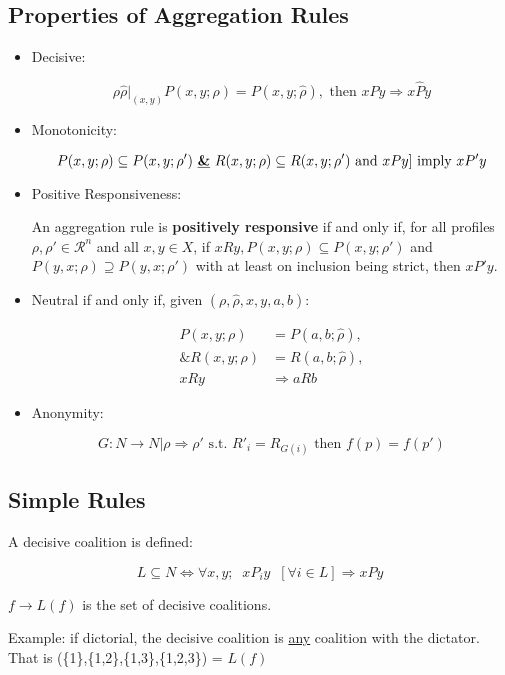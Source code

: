 \documentclass{article}
\newcommand{\R}{\mathcal{R}}
\begin{document}
 \subsection*{Properties of Aggregation Rules}
 \begin{itemize}
 
 \item Decisive:

 \[
\rho\hat{\rho}|_{(x,y)} P(x,y; \rho) = P(x,y; \hat{\rho}), \text{ then } xPy \Rightarrow x\hat{P}y
 \]


 \item Monotonicity:

 \[
P(x,y;\rho)\subseteq P(x,y; \rho') \text{ \textbf{\underline{\&}} } R(x,y;\rho)\subseteq R(x,y; \rho') \text{ and } xPy ]  \text{ imply } xP'y
 \]


 \item Positive Responsiveness:

An aggregation rule is \textbf{positively responsive} if and only if, for all profiles $\rho,\rho' \in \R^n$ and all $x,y \in X$, if $xRy, P(x,y;\rho) \subseteq P(x,y;\rho')$ and $P(y,x; \rho)\supseteq P(y,x; \rho')$ with at least on inclusion being strict, then $xP'y$. 
\item Neutral if and only if, given $(\rho, \hat{\rho}, x,y,a,b) $:

\begin{align*}
P(x,y;\rho) &= P(a,b; \hat{\rho}),\\
\&R(x,y;\rho) &= R(a,b; \hat{\rho}),\\
xRy &\Rightarrow aRb
\end{align*}

\item Anonymity:

\[
G:N\to N|\rho \Rightarrow \rho' \text{ s.t. } R'_i = R_{G(i)} \text{ then } f(p) = f(p')
\]

 \end{itemize}

  \subsection*{Simple Rules}

  A decisive coalition is defined:

  \[
  L \subseteq N \Leftrightarrow \forall x,y;\; \; xP_iy \; \; [\forall i \in L ]\Rightarrow xPy
  \]

  $f \rightarrow L(f)$ is the set of decisive coalitions.

  Example: if dictorial, the decisive coalition is \underline{any} coalition with the dictator. That is (\{1\},\{1,2\},\{1,3\},\{1,2,3\}) = $L(f)$
\end{document}
